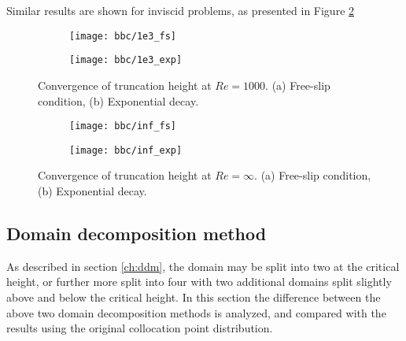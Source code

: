Similar results are shown for inviscid problems, as presented in Figure \ref{fig:hinf}
\begin{figure}[ht]
    \centering
    \begin{subfigure}[b]{\columnwidth}
        \centering
        \texttt{[image: bbc/1e3\_fs]}
        \caption{}
    \end{subfigure}
    \hspace{0.05\columnwidth}
    \begin{subfigure}[b]{\columnwidth}
        \centering
        \texttt{[image: bbc/1e3\_exp]}
        \caption{}
    \end{subfigure}
    \caption{Convergence of truncation height at $Re=1000$. (a) Free-slip condition, (b) Exponential decay.}
    \label{fig:h1e3}
\end{figure}
\begin{figure}[ht]
    \centering
    \begin{subfigure}[b]{\columnwidth}
        \centering
        \texttt{[image: bbc/inf\_fs]}
        \caption{}
    \end{subfigure}
    \hspace{0.05\columnwidth}
    \begin{subfigure}[b]{\columnwidth}
        \centering
        \texttt{[image: bbc/inf\_exp]}
        \caption{}
    \end{subfigure}
    \caption{Convergence of truncation height at $Re=\infty$. (a) Free-slip condition, (b) Exponential decay.}
    \label{fig:hinf}
\end{figure}

\subsection{Domain decomposition method}
As described in section \ref{ch:ddm}, the domain may be split into two at the critical height, or further more split into four with two additional domains split slightly above and below the critical height. In this section the difference between the above two domain decomposition methods is analyzed, and compared with the results using the original collocation point distribution.

